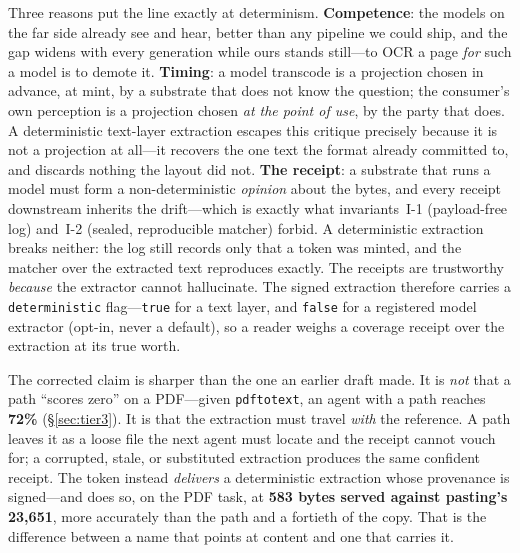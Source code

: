 \documentclass[10pt,twocolumn]{article}
\begin{document}
Three reasons put the line exactly at determinism. \textbf{Competence}: the models on
the far side already see and hear, better than any pipeline we could ship, and the
gap widens with every generation while ours stands still---to OCR a page \emph{for}
such a model is to demote it. \textbf{Timing}: a model transcode is a projection
chosen in advance, at mint, by a substrate that does not know the question; the
consumer's own perception is a projection chosen \emph{at the point of use}, by the
party that does. A deterministic text-layer extraction escapes this critique
precisely because it is not a projection at all---it recovers the one text the format
already committed to, and discards nothing the layout did not. \textbf{The receipt}:
a substrate that runs a model must form a non-deterministic \emph{opinion} about the
bytes, and every receipt downstream inherits the drift---which is exactly what
invariants~I-1 (payload-free log) and~I-2 (sealed, reproducible matcher) forbid. A
deterministic extraction breaks neither: the log still records only that a token was
minted, and the matcher over the extracted text reproduces exactly. The receipts are
trustworthy \emph{because} the extractor cannot hallucinate. The signed extraction
therefore carries a \texttt{deterministic} flag---\texttt{true} for a text layer,
and \texttt{false} for a registered model extractor (opt-in, never a default), so a
reader weighs a coverage receipt over the extraction at its true worth.

The corrected claim is sharper than the one an earlier draft made. It is
\emph{not} that a path ``scores zero'' on a PDF---given \texttt{pdftotext}, an agent
with a path reaches \textbf{72\%} (\S\ref{sec:tier3}). It is that the extraction must
travel \emph{with} the reference. A path leaves it as a loose file the next agent
must locate and the receipt cannot vouch for; a corrupted, stale, or substituted
extraction produces the same confident receipt. The token instead \emph{delivers} a
deterministic extraction whose provenance is signed---and does so, on the PDF task,
at \textbf{583 bytes served against pasting's 23{,}651}, more accurately than the
path and a fortieth of the copy. That is the difference between a name that points at
content and one that carries it.
\end{document}
